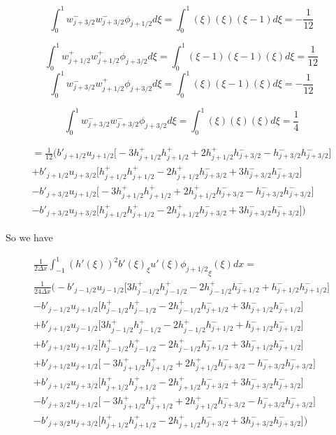 \documentclass[12pt]{article}
\begin{document}
\[\int_{0}^{1} w^-_{j+3/2}w^-_{j+3/2} \phi_{j+1/2} d\xi =\int_{0}^{1} (\xi)(\xi)(\xi - 1 ) d\xi = - \frac{1}{12} \]

\[\int_{0}^{1} w^+_{j+1/2}w^+_{j+1/2} \phi_{j+3/2} d\xi =\int_{0}^{1} (\xi -1)(\xi -1)(\xi ) d\xi =   \frac{1}{12}\]
\[\int_{0}^{1} w^-_{j+3/2}w^+_{j+1/2} \phi_{j+3/2} d\xi =\int_{0}^{1} (\xi)(\xi -1)(\xi) d\xi = -\frac{1}{12}\]

\[\int_{0}^{1} w^-_{j+3/2}w^-_{j+3/2} \phi_{j+3/2} d\xi =\int_{0}^{1} (\xi)(\xi)(\xi ) d\xi = \frac{1}{4} \]


\begin{multline} 
 = \frac{1}{12} \bigg(b'_{j+1/2}u_{j+1/2} \bigg[-3h^+_{j+1/2}h^+_{j+1/2} + 2h^+_{j+1/2}h^-_{j+3/2}  - h^-_{j+3/2}h^-_{j+3/2} \bigg]\\ + b'_{j+1/2}u_{j+3/2}\bigg[h^+_{j+1/2}h^+_{j+1/2} - 2h^+_{j+1/2}h^-_{j+3/2} + 3h^-_{j+3/2}h^-_{j+3/2}\bigg] \\
-  b'_{j+3/2} u_{j+1/2}\bigg[-3h^+_{j+1/2}h^+_{j+1/2} + 2h^+_{j+1/2}h^-_{j+3/2}  - h^-_{j+3/2}h^-_{j+3/2} \bigg] \\
-  b'_{j+3/2}u_{j+3/2} \bigg[h^+_{j+1/2}h^+_{j+1/2} - 2h^+_{j+1/2}h^-_{j+3/2} + 3h^-_{j+3/2}h^-_{j+3/2}\bigg] \bigg)
\end{multline}

So we have

\begin{multline} 
\frac{1}{2 \Delta x} \int_{-1}^{1} (h'(\xi))^2b'(\xi)_{\xi} u'(\xi) {\phi_{j+1/2}}_{\xi}(\xi)dx =\\  \frac{1}{24\Delta x}  \bigg( -b'_{j-1/2}u_{j-1/2}\bigg[ 3h^+_{j-1/2}h^+_{j-1/2} - 2h^+_{j-1/2}h^-_{j+1/2}  + h^-_{j+1/2}h^-_{j+1/2} \bigg] \\- b'_{j-1/2}u_{j+1/2} \bigg[ h^+_{j-1/2}h^+_{j-1/2}  - 2h^+_{j-1/2}h^-_{j+1/2}  + 3h^-_{j+1/2}h^-_{j+1/2} \bigg] \\+ b'_{j+1/2} u_{j-1/2} \bigg[ 3h^+_{j-1/2}h^+_{j-1/2} - 2h^+_{j-1/2}h^-_{j+1/2}  + h^-_{j+1/2}h^-_{j+1/2} \bigg] \\+ b'_{j+1/2}u_{j+1/2}  \bigg[ h^+_{j-1/2}h^+_{j-1/2}  - 2h^+_{j-1/2}h^-_{j+1/2}  + 3h^-_{j+1/2}h^-_{j+1/2} \bigg] \\ + b'_{j+1/2}u_{j+1/2} \bigg[-3h^+_{j+1/2}h^+_{j+1/2} + 2h^+_{j+1/2}h^-_{j+3/2}  - h^-_{j+3/2}h^-_{j+3/2} \bigg]\\ + b'_{j+1/2}u_{j+3/2}\bigg[h^+_{j+1/2}h^+_{j+1/2} - 2h^+_{j+1/2}h^-_{j+3/2} + 3h^-_{j+3/2}h^-_{j+3/2}\bigg] \\
-  b'_{j+3/2} u_{j+1/2}\bigg[-3h^+_{j+1/2}h^+_{j+1/2} + 2h^+_{j+1/2}h^-_{j+3/2}  - h^-_{j+3/2}h^-_{j+3/2} \bigg] \\
-  b'_{j+3/2}u_{j+3/2} \bigg[h^+_{j+1/2}h^+_{j+1/2} - 2h^+_{j+1/2}h^-_{j+3/2} + 3h^-_{j+3/2}h^-_{j+3/2}\bigg]\bigg)
\end{multline}
\end{document}
